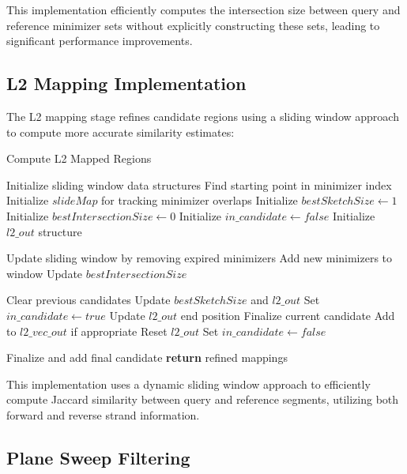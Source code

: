 \documentclass{article}
\begin{document}
This implementation efficiently computes the intersection size between query and reference minimizer sets without explicitly constructing these sets, leading to significant performance improvements.

\subsection{L2 Mapping Implementation}

The L2 mapping stage refines candidate regions using a sliding window approach to compute more accurate similarity estimates:

\begin{algorithm}
\caption{Compute L2 Mapped Regions}
\begin{algorithmic}[1]
\State Initialize sliding window data structures
\State Find starting point in minimizer index
\State Initialize $slideMap$ for tracking minimizer overlaps
\State Initialize $bestSketchSize \gets 1$
\State Initialize $bestIntersectionSize \gets 0$
\State Initialize $in\_candidate \gets false$
\State Initialize $l2\_out$ structure

    \State Update sliding window by removing expired minimizers
    \State Add new minimizers to window
    \State Update $bestIntersectionSize$
    
        \State Clear previous candidates
        \State Update $bestSketchSize$ and $l2\_out$
        \State Set $in\_candidate \gets true$
        \State Update $l2\_out$ end position
    \Else
            \State Finalize current candidate
            \State Add to $l2\_vec\_out$ if appropriate
            \State Reset $l2\_out$
        \EndIf
        \State Set $in\_candidate \gets false$
    \EndIf
\EndWhile

    \State Finalize and add final candidate
\EndIf
\State \textbf{return} refined mappings
\EndProcedure
\end{algorithmic}
\end{algorithm}

This implementation uses a dynamic sliding window approach to efficiently compute Jaccard similarity between query and reference segments, utilizing both forward and reverse strand information.

\subsection{Plane Sweep Filtering}
\end{document}

